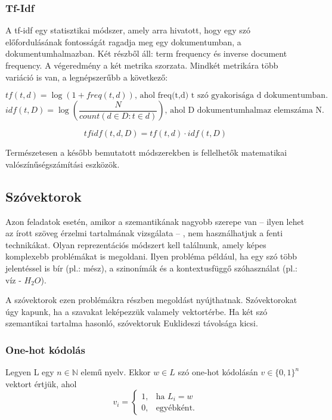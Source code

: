 \subsubsection{Tf-Idf}

A tf-idf egy statisztikai módszer, amely arra hivatott, hogy egy szó előfordulásának fontosságát ragadja meg egy dokumentumban, a dokumentumhalmazban. Két részből áll: term frequency és inverse document frequency. A végeredmény a két metrika szorzata. Mindkét metrikára több variáció is van, a legnépszerűbb a következő:

\begin{definition}
$$tf\left(t,d\right) = \log \left( 1 + freq\left(t,d\right)\right) \text{, ahol freq(t,d) t szó gyakorisága d dokumentumban.}$$
$$idf\left(t,D\right) = \log \left( \frac{N}{count \left( d \in D:t \in d \right) } \right) \text{, ahol D dokumentumhalmaz elemszáma N.}$$

$$tfidf(t,d,D) = tf(t,d) \cdot idf(t,D)$$

\end{definition}

\begin{note}
	Természetesen a később bemutatott módszerekben is fellelhetők matematikai valószínűségszámítási eszközök.
\end{note}

\subsection{Szóvektorok}

Azon feladatok esetén, amikor a szemantikának nagyobb szerepe van – ilyen lehet az írott szöveg érzelmi tartalmának vizsgálata – , nem használhatjuk a fenti technikákat. Olyan reprezentációs módszert kell találnunk, amely képes komplexebb problémákat is megoldani. Ilyen probléma például, ha egy szó több jelentéssel is bír (pl.: mész), a szinonímák és a kontextusfüggő szóhasználat (pl.: víz - $H_2O$).

A szóvektorok ezen problémákra részben megoldást nyújthatnak. Szóvektorokat úgy kapunk, ha a szavakat leképezzük valamely vektortérbe. Ha két szó szemantikai tartalma hasonló, szóvektoruk Euklideszi távolsága kicsi.

\subsubsection{One-hot kódolás}

\begin{definition}
Legyen L egy $n \in \mathbb{N}$ elemű nyelv. Ekkor $w \in L$ szó one-hot kódolásán $v \in \{0,1\}^n$ vektort értjük, ahol 
\[
v_i= 
\begin{cases}
1,				& \text{ha } L_i = w\\
0,              & \text{egyébként.}
\end{cases}
\]
\end{definition}


